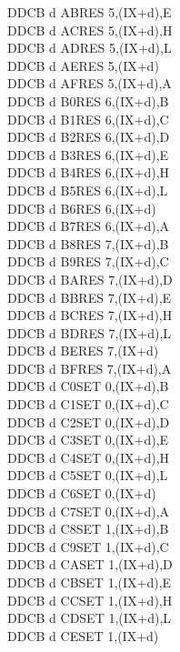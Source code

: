 \begin{multicols}{3}
{\begin{tabbing}
	DDCB d AB\>RES 5,(IX+d),E\UNDOC\\
	DDCB d AC\>RES 5,(IX+d),H\UNDOC\\
	DDCB d AD\>RES 5,(IX+d),L\UNDOC\\
	DDCB d AE\>RES 5,(IX+d)\\
	DDCB d AF\>RES 5,(IX+d),A\UNDOC\\
	DDCB d B0\>RES 6,(IX+d),B\UNDOC\\
	DDCB d B1\>RES 6,(IX+d),C\UNDOC\\
	DDCB d B2\>RES 6,(IX+d),D\UNDOC\\
	DDCB d B3\>RES 6,(IX+d),E\UNDOC\\
	DDCB d B4\>RES 6,(IX+d),H\UNDOC\\
	DDCB d B5\>RES 6,(IX+d),L\UNDOC\\
	DDCB d B6\>RES 6,(IX+d)\\
	DDCB d B7\>RES 6,(IX+d),A\UNDOC\\
	DDCB d B8\>RES 7,(IX+d),B\UNDOC\\
	DDCB d B9\>RES 7,(IX+d),C\UNDOC\\
	DDCB d BA\>RES 7,(IX+d),D\UNDOC\\
	DDCB d BB\>RES 7,(IX+d),E\UNDOC\\
	DDCB d BC\>RES 7,(IX+d),H\UNDOC\\
	DDCB d BD\>RES 7,(IX+d),L\UNDOC\\
	DDCB d BE\>RES 7,(IX+d)\\
	DDCB d BF\>RES 7,(IX+d),A\UNDOC\\
	DDCB d C0\>SET 0,(IX+d),B\UNDOC\\
	DDCB d C1\>SET 0,(IX+d),C\UNDOC\\
	DDCB d C2\>SET 0,(IX+d),D\UNDOC\\
	DDCB d C3\>SET 0,(IX+d),E\UNDOC\\
	DDCB d C4\>SET 0,(IX+d),H\UNDOC\\
	DDCB d C5\>SET 0,(IX+d),L\UNDOC\\
	DDCB d C6\>SET 0,(IX+d)\\
	DDCB d C7\>SET 0,(IX+d),A\UNDOC\\
	DDCB d C8\>SET 1,(IX+d),B\UNDOC\\
	DDCB d C9\>SET 1,(IX+d),C\UNDOC\\
	DDCB d CA\>SET 1,(IX+d),D\UNDOC\\
	DDCB d CB\>SET 1,(IX+d),E\UNDOC\\
	DDCB d CC\>SET 1,(IX+d),H\UNDOC\\
	DDCB d CD\>SET 1,(IX+d),L\UNDOC\\
	DDCB d CE\>SET 1,(IX+d)\\

\end{tabbing}}
\end{multicols}
